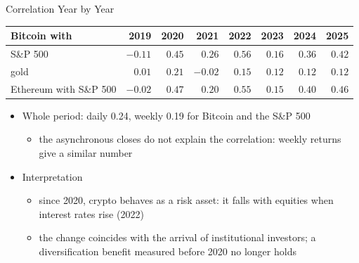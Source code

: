 \begin{frame}{Correlation Year by Year}
\itemsize{\footnotesize}
\begin{center}
\scriptsize
\begin{tabular}{lrrrrrrr}
\toprule
Bitcoin with & 2019 & 2020 & 2021 & 2022 & 2023 & 2024 & 2025 \\
\midrule
S\&P 500 & $-0.11$ & $0.45$ & $0.26$ & $0.56$ & $0.16$ & $0.36$ & $0.42$ \\
gold & $0.01$ & $0.21$ & $-0.02$ & $0.15$ & $0.12$ & $0.12$ & $0.12$ \\
Ethereum with S\&P 500 & $-0.02$ & $0.47$ & $0.20$ & $0.55$ & $0.15$ & $0.40$ & $0.46$ \\
\bottomrule
\end{tabular}
\end{center}
\begin{itemize}
    \item Whole period: daily 0.24, weekly 0.19 for Bitcoin and the S\&P 500
    \begin{itemize}
        \item the asynchronous closes do not explain the correlation: weekly returns give a similar number
    \end{itemize}
    \item Interpretation
    \begin{itemize}
        \item since 2020, crypto behaves as a risk asset: it falls with equities when interest rates rise (2022)
        \item the change coincides with the arrival of institutional investors; a diversification benefit measured before 2020 no longer holds
    \end{itemize}
\end{itemize}
\end{frame}

